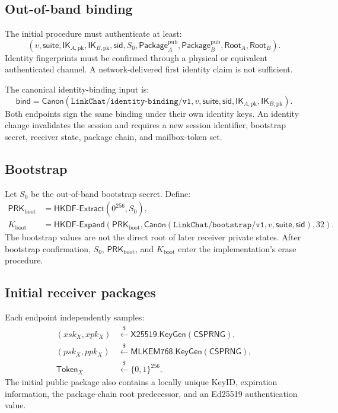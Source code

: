 \documentclass[11pt,letterpaper]{article}
\newcommand{\sample}{\xleftarrow{\$}}
\begin{document}
\subsection{Out-of-band binding}

The initial procedure must authenticate at least:
\[
  (v,\mathsf{suite},\mathsf{IK}_{A,\mathrm{pk}},\mathsf{IK}_{B,\mathrm{pk}},
    \mathsf{sid},S_0,\mathsf{Package}^{\mathrm{pub}}_A,
    \mathsf{Package}^{\mathrm{pub}}_B,
    \mathsf{Root}_A,\mathsf{Root}_B).
\]
Identity fingerprints must be confirmed through a physical or equivalent authenticated
channel. A network-delivered first identity claim is not sufficient.

The canonical identity-binding input is:
\[
  \mathsf{bind} = \mathsf{Canon}(
  \texttt{LinkChat/identity-binding/v1},v,\mathsf{suite},\mathsf{sid},
  \mathsf{IK}_{A,\mathrm{pk}},\mathsf{IK}_{B,\mathrm{pk}}).
\]
Both endpoints sign the same binding under their own identity keys. An identity change
invalidates the session and requires a new session identifier, bootstrap secret, receiver
state, package chain, and mailbox-token set.

\subsection{Bootstrap}

Let $S_0$ be the out-of-band bootstrap secret. Define:
\begin{align*}
  \mathsf{PRK}_{\mathrm{boot}} &= \mathsf{HKDF\mbox{-}Extract}(0^{256},S_0),\\
  K_{\mathrm{boot}} &= \mathsf{HKDF\mbox{-}Expand}(\mathsf{PRK}_{\mathrm{boot}},
       \mathsf{Canon}(\texttt{LinkChat/bootstrap/v1},v,\mathsf{suite},\mathsf{sid}),32).
\end{align*}
The bootstrap values are not the direct root of later receiver private states. After
bootstrap confirmation, $S_0$, $\mathsf{PRK}_{\mathrm{boot}}$, and $K_{\mathrm{boot}}$
enter the implementation's erase procedure.

\subsection{Initial receiver packages}

Each endpoint independently samples:
\[
\begin{aligned}
  (xsk_X,xpk_X) &\sample \mathsf{X25519.KeyGen}(\mathsf{CSPRNG}),\\
  (psk_X,ppk_X) &\sample \mathsf{MLKEM768.KeyGen}(\mathsf{CSPRNG}),\\
  \mathsf{Token}_X &\sample \{0,1\}^{256}.
\end{aligned}
\]
The initial public package also contains a locally unique KeyID, expiration information,
the package-chain root predecessor, and an Ed25519 authentication value.
\end{document}
